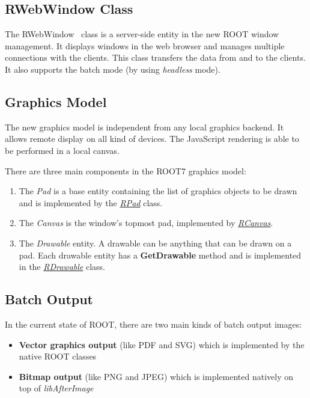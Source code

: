 \documentclass[a4paper]{jpconf}
\begin{document}
\subsection{RWebWindow Class}
The RWebWindow~\cite{rweb} class is a server-side entity in the new ROOT window management.
It displays windows in the web browser and manages multiple connections with the clients.
This class transfers the data from and to the clients. It also supports the batch
mode (by using \textit{headless} mode).

 \subsection{Graphics Model}
 The new graphics model is independent from any local graphics backend. It allows
 remote display on all kind of devices. The JavaScript rendering is able to be
 performed in a local canvas.

There are three main components in the ROOT7 graphics model:
\begin{enumerate}[label=\alph*)]
  \item The \textit{Pad} is a base entity containing the list of graphics objects to be drawn and is implemented by the \textit{\href{https://root.cern/doc/master/classROOT_1_1Experimental_1_1RPad.html}{RPad}} class.
  \item The \textit{Canvas} is the window's topmost pad, implemented by \textit{\href{https://root.cern/doc/master/classROOT_1_1Experimental_1_1RCanvas.html}{RCanvas}}.
  \item The \textit{Drawable} entity. A drawable can be anything that can be drawn on a pad. Each drawable entity has a \textbf{GetDrawable} method and is implemented in the \textit{\href{https://root.cern/doc/master/classROOT_1_1Experimental_1_1RDrawable.html}{RDrawable}} class.
\end{enumerate}

\subsection{Batch Output}

In the current state of ROOT, there are two main kinds of batch output images:
\begin{itemize}
  \item \textbf{Vector graphics output} (like PDF and SVG) which is implemented by the native ROOT classes
  \item \textbf{Bitmap output} (like PNG and JPEG) which is implemented natively on top of \textit{libAfterImage}
\end{itemize}
\end{document}
